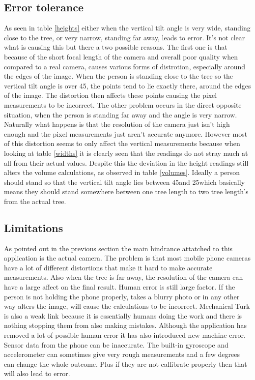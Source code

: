 \subsection{Error tolerance}
As seen in table \ref{heights} either when the vertical tilt angle is very wide, standing close to the tree, or very narrow, standing far away, leads to error. It's not clear what is causing this but there a two possible reasons. The first one is that because of the short focal length of the camera and overall poor quality when compared to a real camera, causes various forms of distrotion, especially around the edges of the image. When the person is standing close to the tree so the vertical tilt angle is over 45\degree, the points tend to lie exactly there, around the edges of the image. The distortion then affects these points causing the pixel measurements to be incorrect. The other problem occurs in the direct opposite situation, when the person is standing far away and the angle is very narrow. Naturally what happens is that the resolution of the camera just isn't high enough and the pixel measurements just aren't accurate anymore. However most of this distortion seems to only affect the vertical measurements because when looking at table \ref{widths} it is clearly seen that the readings do not stray much at all from their actual values. Despite this the deviation in the height readings still alters the volume calculations, as observed in table \ref{volumes}. Ideally a person should stand so that the vertical tilt angle lies between 45\degree and 25\degree which basically means they should stand somewhere between one tree length to two tree length's from the actual tree.
\subsection{Limitations}
As pointed out in the previous section the main hindrance attatched to this application is the actual camera. The problem is that most mobile phone cameras have a lot of different distortions that make it hard to make accurate measurements. Also when the tree is far away, the resolution of the camera can have a large affect on the final result. Human error is still large factor. If the person is not holding the phone properly, takes a blurry photo or in any other way alters the image, will cause the calculations to be incorrect. Mechanical Turk is also a weak link because it is essentially humans doing the work and there is nothing stopping them from also making mistakes. Although the application has removed a lot of possible human error it has also introduced new machine error. Sensor data from the phone can be inaccurate. The built-in gyroscope and accelerometer can sometimes give very rough measurements and a few degrees can change the whole outcome. Plus if they are not callibrate properly then that will also lead to error.
